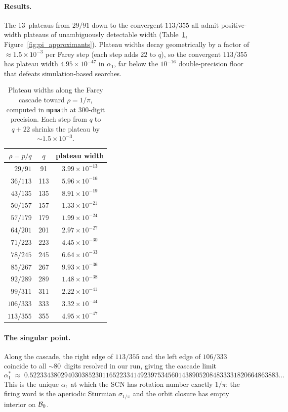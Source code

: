 \paragraph{Results.}
The 13~plateaus from $29/91$ down to the convergent $113/355$ all admit positive-width plateaus of unambiguously detectable width (Table~\ref{tab:cascade}, Figure~\ref{fig:pi_approximants}). Plateau widths decay geometrically by a factor of $\approx 1.5\times 10^{-3}$ per Farey step (each step adds $22$ to $q$), so the convergent $113/355$ has plateau width $4.95\times 10^{-47}$ in $\alpha_1$, far below the $10^{-16}$ double-precision floor that defeats simulation-based searches.

\begin{table}[h]
\centering
\begin{tabular}{rcc}
\hline
$\rho=p/q$ & $q$ & plateau width \\
\hline
$29/91$    &  91 & $3.99\times 10^{-13}$ \\
$36/113$   & 113 & $5.96\times 10^{-16}$ \\
$43/135$   & 135 & $8.91\times 10^{-19}$ \\
$50/157$   & 157 & $1.33\times 10^{-21}$ \\
$57/179$   & 179 & $1.99\times 10^{-24}$ \\
$64/201$   & 201 & $2.97\times 10^{-27}$ \\
$71/223$   & 223 & $4.45\times 10^{-30}$ \\
$78/245$   & 245 & $6.64\times 10^{-33}$ \\
$85/267$   & 267 & $9.93\times 10^{-36}$ \\
$92/289$   & 289 & $1.48\times 10^{-38}$ \\
$99/311$   & 311 & $2.22\times 10^{-41}$ \\
$106/333$  & 333 & $3.32\times 10^{-44}$ \\
$113/355$  & 355 & $4.95\times 10^{-47}$ \\
\hline
\end{tabular}
\caption{Plateau widths along the Farey cascade toward $\rho=1/\pi$, computed in \texttt{mpmath} at $300$-digit precision. Each step from $q$ to $q{+}22$ shrinks the plateau by ${\sim}1.5\times 10^{-3}$.}
\label{tab:cascade}
\end{table}

\paragraph{The singular point.}
Along the cascade, the right edge of $113/355$ and the left edge of $106/333$ coincide to all $\sim 80$~digits resolved in our run, giving the cascade limit
\begin{equation}
\alpha_1^*\;\approx\;0.522334380294030385230116522334149239753456014389052084833331820664863883\ldots
\end{equation}
This is the unique $\alpha_1$ at which the SCN has rotation number exactly $1/\pi$: the firing word is the aperiodic Sturmian $\sigma_{1/\pi}$ and the orbit closure has empty interior on $\mathcal{B}_0$.

